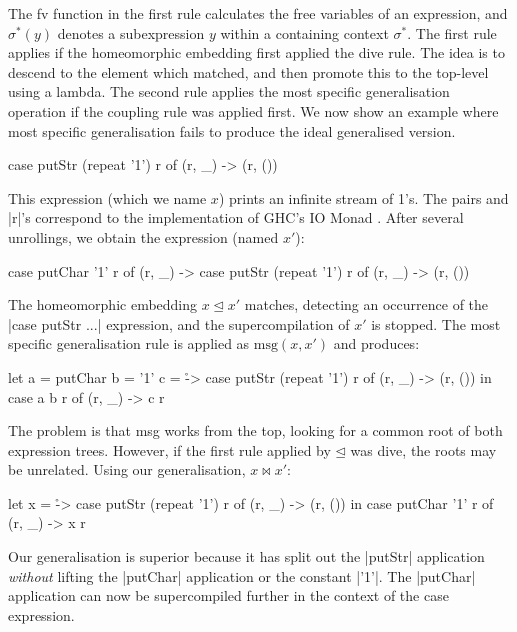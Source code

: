 The fv function in the first rule calculates the free variables of an expression, and $\sigma^*(y)$ denotes a subexpression $y$ within a containing context $\sigma^*$. The first rule applies if the homeomorphic embedding first applied the dive rule. The idea is to descend to the element which matched, and then promote this to the top-level using a lambda. The second rule applies the most specific generalisation operation if the coupling rule was applied first. We now show an example where most specific generalisation fails to produce the ideal generalised version.

\begin{example}

\begin{code}
case  putStr (repeat '1') r of
      (r, _) -> (r, ())
\end{code}

This expression (which we name $x$) prints an infinite stream of 1's. The pairs and |r|'s correspond to the implementation of GHC's IO Monad \cite{spj:awkward_squad}. After several unrollings, we obtain the expression (named $x'$):

\begin{code}
case  putChar '1' r of
      (r, _) -> case  putStr (repeat '1') r of
                      (r, _) -> (r, ())
\end{code}

The homeomorphic embedding $x \unlhd x'$ matches, detecting an occurrence of the |case putStr \? ...| expression, and the supercompilation of $x'$ is stopped. The most specific generalisation rule is applied as $\text{msg}(x,x')$ and produces:

\begin{code}
let  a = putChar
     b = '1'
     c = \r -> case  putStr (repeat '1') r of
                     (r, _) -> (r, ())
in case  a b r of
         (r, _) -> c r
\end{code}

The problem is that msg works from the top, looking for a common root of both expression trees. However, if the first rule applied by $\unlhd$ was dive, the roots may be unrelated. Using our generalisation, $x \bowtie x'$:

\begin{code}
let x = \r -> case  putStr (repeat '1') r of
                    (r, _) -> (r, ())
in case  putChar '1' r of
         (r, _) -> x r
\end{code}

Our generalisation is superior because it has split out the |putStr| application \textit{without} lifting the |putChar| application or the constant |'1'|. The |putChar| application can now be supercompiled further in the context of the case expression.
\end{example}



